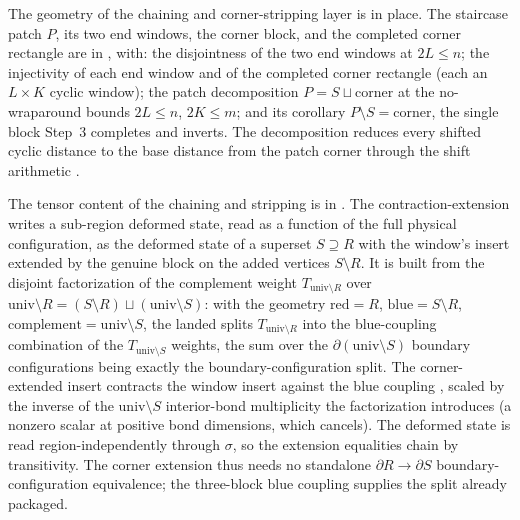 \documentclass{article}
\begin{document}
The geometry of the chaining and corner-stripping layer is in place. The
staircase patch $P$, its two end windows, the corner block, and the
completed corner rectangle are in
, with: the disjointness of the two
end windows at $2L \le n$; the injectivity of each end window and of the
completed corner rectangle (each an $L \times K$ cyclic window); the patch
decomposition $P = S \sqcup \text{corner}$ at the no-wraparound bounds
$2L \le n$, $2K \le m$; and its corollary $P \setminus S = \text{corner}$,
the single block Step~3 completes and inverts. The decomposition reduces every
shifted cyclic distance to the base distance from the patch corner through the
shift arithmetic .

The tensor content of the chaining and stripping is in
. The contraction-extension
 writes a sub-region deformed state, read
as a function of the full physical configuration, as the deformed state of
a superset $S \supseteq R$ with the window's insert extended by the genuine
block on the added vertices $S \setminus R$. It is built from the disjoint
factorization of the complement weight $T_{\mathrm{univ} \setminus R}$ over
$\mathrm{univ} \setminus R = (S \setminus R) \sqcup
    (\mathrm{univ} \setminus S)$: with the geometry $\mathrm{red} = R$,
$\mathrm{blue} = S \setminus R$,
$\mathrm{complement} = \mathrm{univ} \setminus S$, the landed
splits $T_{\mathrm{univ} \setminus R}$ into the blue-coupling combination of
the $T_{\mathrm{univ} \setminus S}$ weights, the sum over the
$\partial(\mathrm{univ} \setminus S)$ boundary configurations being exactly
the boundary-configuration split. The corner-extended insert
 contracts the window insert against the blue coupling
, scaled by the inverse of the
$\mathrm{univ} \setminus S$ interior-bond multiplicity the factorization
introduces (a nonzero scalar at positive bond dimensions, which cancels).
The deformed state is read region-independently through $\sigma$,
so the extension equalities chain by transitivity. The corner extension thus
needs no standalone $\partial R \to \partial S$ boundary-configuration
equivalence; the three-block blue coupling supplies the split already
packaged.
\end{document}
